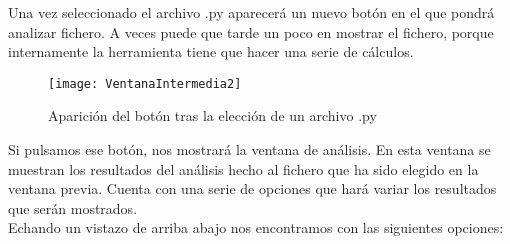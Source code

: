 Una vez seleccionado el archivo .py aparecerá un nuevo botón en el que pondrá analizar fichero. A veces puede que tarde un poco en mostrar el fichero, porque internamente la herramienta tiene que hacer una serie de cálculos.\\
\begin{figure}[H]
\centering
\texttt{[image: VentanaIntermedia2]}
\caption{Aparición del botón tras la elección de un archivo .py}
\end{figure}
Si pulsamos ese botón, nos mostrará la ventana de análisis. En esta ventana se muestran los resultados del análisis hecho al fichero que ha sido elegido en la ventana previa. Cuenta con una serie de opciones que hará variar los resultados que serán mostrados.\\

Echando un vistazo de arriba abajo nos encontramos con las siguientes opciones:\\

